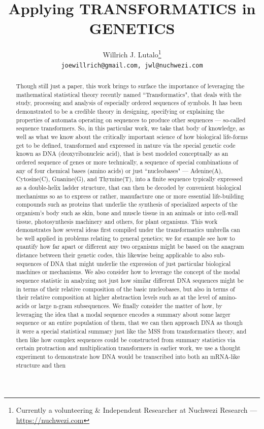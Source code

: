 \documentclass[a4paper, 18pt]{article} %
\title{Applying \textbf{TRANSFORMATICS} in GENETICS}
\author{Willrich J. Lutalo\thanks{Currently a volunteering \& Independent Researcher at Nuchwezi Research --- \url{https://nuchwezi.com}}\\
\texttt{joewillrich@gmail.com, jwl@nuchwezi.com}}
\begin{document}


\maketitle


\Large

\begin{abstract}
\large

Though still just a paper, this work brings to surface the importance of leveraging the mathematical statistical theory recently named ``Transformatics", that deals with the study, processing and analysis of especially ordered sequences of symbols. It has been demonstrated to be a credible theory in designing, specifying or explaining the properties of automata operating on sequences to produce other sequences --- so-called sequence transformers. So, in this particular work, we take that body of knowledge, as well as what we know about the critically important science of how biological life-forms get to be defined, transformed and expressed in nature via the special genetic code known as DNA (deoxyribonucleic acid), that is best modeled conceptually as an ordered sequence of genes or more technically, a sequence of special combinations of any of four chemical bases (amino acids) or just ``nucleobases" --- Adenine(A), Cytosine(C), Guanine(G), and Thymine(T), into a finite sequence typically expressed as a double-helix ladder structure, that can then be decoded by convenient biological mechanisms so as to express or rather, manufacture one or more essential life-building compounds such as proteins that underlie the synthesis of specialized aspects of the organism's body such as skin, bone and muscle tissue in an animals or into cell-wall tissue, photosynthesis machinery and others, for plant organisms. This work demonstrates how several ideas first compiled under the transformatics umbrella can be well applied in problems relating to general genetics; we for example see how to quantify how far apart or different any two organisms might be based on the anagram distance between their genetic codes, this likewise being applicable to also sub-sequences of DNA that might underlie the expression of  just particular biological machines or mechanisms. We also consider how to leverage the concept of the modal sequence statistic in analyzing not just how similar different DNA sequences might be in terms of their relative composition of the basic nucleobases, but also in terms of their relative composition at higher abstraction levels such as at the level of amino-acids or large n-gram subsequences. We finally consider the matter of how, by leveraging the idea that a modal sequence encodes a summary about some larger sequence or an entire population of them, that we can then approach DNA as though it were a special statistical summary just like the MSS from transformatics theory, and then like how complex sequences could be constructed from summary statistics via certain protraction and multiplication transformers in earlier work, we use a thought experiment to demonstrate how DNA would be transcribed into both an mRNA-like structure and then 
\end{abstract}
\end{document}
